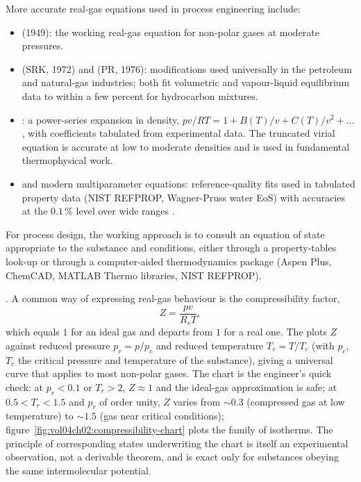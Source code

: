 More accurate real-gas equations used in process engineering include:

\begin{itemize}[leftmargin=*]
  \item {} (1949): the working real-gas equation
    for non-polar gases at moderate pressures.
  \item {} (SRK, 1972) and
     (PR, 1976): modifications used universally
    in the petroleum and natural-gas industries; both fit volumetric
    and vapour-liquid equilibrium data to within a few percent for
    hydrocarbon mixtures.
  \item {}: a power-series expansion in
    density, $pv/RT = 1 + B(T)/v + C(T)/v^2 + \ldots$, with
    coefficients tabulated from experimental data. The truncated
    virial equation is accurate at low to moderate densities and is
    used in fundamental thermophysical work.
  \item {} and modern multiparameter
    equations: reference-quality fits used in tabulated property data
    (NIST REFPROP, Wagner-Pruss water EoS) with accuracies at the
    $0.1\,\%$ level over wide ranges \cite{text:smith-van-ness-thermo}.
\end{itemize}

For process design, the working approach is to consult an equation of
state appropriate to the substance and conditions, either through a
property-tables look-up or through a computer-aided thermodynamics
package (Aspen Plus, ChemCAD, MATLAB Thermo libraries, NIST REFPROP).

. A common way of expressing
real-gas behaviour is the compressibility factor,
\[
Z = \frac{pv}{R_s T},
\]
which equals $1$ for an ideal gas and departs from $1$ for a real
one. The  plots $Z$
against reduced pressure $p_r = p/p_c$ and reduced temperature $T_r =
T/T_c$ (with $p_c$, $T_c$ the critical pressure and temperature of
the substance), giving a universal curve that applies to most
non-polar gases. The chart is the engineer's quick check: at $p_r <
0.1$ or $T_r > 2$, $Z \approx 1$ and the ideal-gas approximation is
safe; at $0.5 < T_r < 1.5$ and $p_r$ of order unity, $Z$ varies from
$\sim 0.3$ (compressed gas at low temperature) to $\sim 1.5$ (gas
near critical conditions); figure~\ref{fig:vol04ch02:compressibility-chart}
plots the family of isotherms. The principle of corresponding states
underwriting the chart is itself an experimental observation, not a
derivable theorem, and is exact only for substances obeying the same
intermolecular potential.

